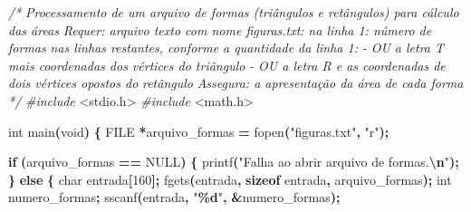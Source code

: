 \documentclass[
  11pt,
  a4paper,
]{scrbook}
\newenvironment{Shaded}{\begin{snugshade}}{\end{snugshade}}
\newcommand{\CommentTok}[1]{\textcolor[rgb]{0.56,0.35,0.01}{\textit{#1}}}
\newcommand{\ControlFlowTok}[1]{\textcolor[rgb]{0.13,0.29,0.53}{\textbf{#1}}}
\newcommand{\DataTypeTok}[1]{\textcolor[rgb]{0.13,0.29,0.53}{#1}}
\newcommand{\DecValTok}[1]{\textcolor[rgb]{0.00,0.00,0.81}{#1}}
\newcommand{\ImportTok}[1]{#1}
\newcommand{\KeywordTok}[1]{\textcolor[rgb]{0.13,0.29,0.53}{\textbf{#1}}}
\newcommand{\NormalTok}[1]{#1}
\newcommand{\OperatorTok}[1]{\textcolor[rgb]{0.81,0.36,0.00}{\textbf{#1}}}
\newcommand{\PreprocessorTok}[1]{\textcolor[rgb]{0.56,0.35,0.01}{\textit{#1}}}
\newcommand{\SpecialCharTok}[1]{\textcolor[rgb]{0.81,0.36,0.00}{\textbf{#1}}}
\newcommand{\StringTok}[1]{\textcolor[rgb]{0.31,0.60,0.02}{#1}}
\begin{document}
\begin{Shaded}
\begin{Highlighting}[]
\CommentTok{/*}
\CommentTok{Processamento de um arquivo de formas (triângulos e retângulos) para cálculo}
\CommentTok{    das áreas}
\CommentTok{Requer: arquivo texto com nome \textquotesingle{}figuras.txt\textquotesingle{}:}
\CommentTok{    na linha 1: número de formas}
\CommentTok{    nas linhas restantes, conforme a quantidade da linha 1:}
\CommentTok{        {-} OU a letra T mais coordenadas dos vértices do triângulo}
\CommentTok{        {-} OU a letra R e as coordenadas de dois vértices opostos do}
\CommentTok{            retângulo}
\CommentTok{Assegura: a apresentação da área de cada forma}
\CommentTok{*/}
\PreprocessorTok{\#include }\ImportTok{\textless{}stdio.h\textgreater{}}
\PreprocessorTok{\#include }\ImportTok{\textless{}math.h\textgreater{}}

\DataTypeTok{int}\NormalTok{ main}\OperatorTok{(}\DataTypeTok{void}\OperatorTok{)} \OperatorTok{\{}
    \DataTypeTok{FILE} \OperatorTok{*}\NormalTok{arquivo\_formas }\OperatorTok{=}\NormalTok{ fopen}\OperatorTok{(}\StringTok{"figuras.txt"}\OperatorTok{,} \StringTok{"r"}\OperatorTok{);}

    \ControlFlowTok{if} \OperatorTok{(}\NormalTok{arquivo\_formas }\OperatorTok{==}\NormalTok{ NULL}\OperatorTok{)} \OperatorTok{\{}
\NormalTok{        printf}\OperatorTok{(}\StringTok{"Falha ao abrir arquivo de formas.}\SpecialCharTok{\textbackslash{}n}\StringTok{"}\OperatorTok{);}
    \OperatorTok{\}}
    \ControlFlowTok{else} \OperatorTok{\{}
        \DataTypeTok{char}\NormalTok{ entrada}\OperatorTok{[}\DecValTok{160}\OperatorTok{];}
\NormalTok{        fgets}\OperatorTok{(}\NormalTok{entrada}\OperatorTok{,} \KeywordTok{sizeof}\NormalTok{ entrada}\OperatorTok{,}\NormalTok{ arquivo\_formas}\OperatorTok{);}
        \DataTypeTok{int}\NormalTok{ numero\_formas}\OperatorTok{;}
\NormalTok{        sscanf}\OperatorTok{(}\NormalTok{entrada}\OperatorTok{,} \StringTok{"}\SpecialCharTok{\%d}\StringTok{"}\OperatorTok{,} \OperatorTok{\&}\NormalTok{numero\_formas}\OperatorTok{);}


\end{Highlighting}
\end{Shaded}
\end{document}
